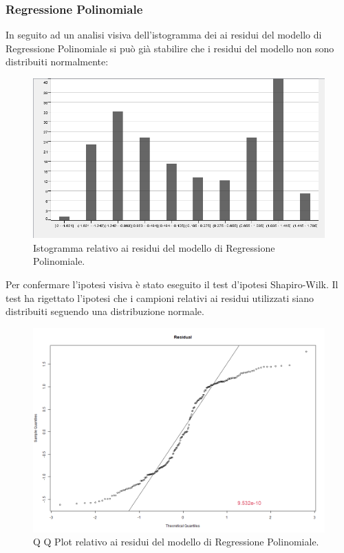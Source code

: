 \documentclass[12pt, a4paper, twocolumn]{article} %
\begin{document}
\subsubsection{Regressione Polinomiale}
In seguito ad un analisi visiva dell'istogramma dei ai residui del modello di Regressione Polinomiale si può già stabilire che i residui del modello non sono distribuiti normalmente:
\begin{figure}[H]
  \includegraphics[scale=0.38]{./Immagini/hist-polinomial-regression.png}
  \caption{Istogramma relativo ai residui del modello di Regressione Polinomiale.}
\end{figure}
Per confermare l'ipotesi visiva è stato eseguito il test d'ipotesi Shapiro-Wilk. Il test ha rigettato l'ipotesi che i campioni relativi ai residui utilizzati siano distribuiti seguendo una distribuzione normale.
\begin{figure}[H]
  \includegraphics[scale=0.25]{./Immagini/qq-plot-polinomial-regression.png}
  \caption{Q Q Plot relativo ai residui del modello di Regressione Polinomiale.}
\end{figure}
\end{document}
